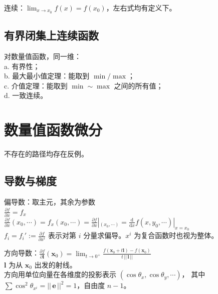 \documentclass[12pt, a4paper, UTF8, openany]{ctexbook}
\newcommand{\dif}{\mathrm{d}}
\newcommand{\mat}[1]{\mathbf{#1}}
\newcommand{\len}[1]{||\, #1 \,||}%
\begin{document}
        连续：$\lim_{x \to x_0} f(x) = f(x_0)$，左右式均有定义下。

        \subsection{有界闭集上连续函数}
        对数量值函数，同一维：\\
        a. 有界性；\\
        b. 最大最小值定理：能取到 $\min / \max$；\\
        c. 介值定理：能取到 $\min \sim \max$ 之间的所有值；\\
        d. 一致连续。

    \section{数量值函数微分}
        不存在的路径均存在反例。


        \subsection{导数与梯度}
        偏导数：取主元，其余为参数 \\
        $\frac{\partial f}{\partial x} = f_x$ \\
        $\frac{\partial f}{\partial x}(x_0, \cdots) = f_x (x_0, \cdots) 
        = \frac{\partial f}{\partial x}|_{(x_0, \cdots)} = \frac{\dif}{\dif x} f(x, y_0, \cdots)|_{x = x_0}$ \\
        $f_i = f_i' := \frac{\partial f}{\partial x^i}$ 表示对第 $i$ 分量求偏导。$x^i$ 为复合函数时也视为整体。

        方向导数：$\frac{\partial f}{\partial \mat{l}}(\mat{x}_0) 
        = \lim_{t \to 0^{+}} \frac{f(\mat{x}_0 + t\mat{l}) - f(\mat{x}_0)}{t \, \len{\mat{l}}}$ \\
        $\mat{l}$ 为从 $\mat{x}_0$ 出发的射线。\\
        方向用单位向量在各维度的投影表示 $(\cos\theta_x, \cos\theta_y, \cdots)$，
        其中 $\sum \cos^2 \theta_{x^i} = \len{\mat{e}}^2 = 1$，自由度 $n - 1$。
\end{document}
